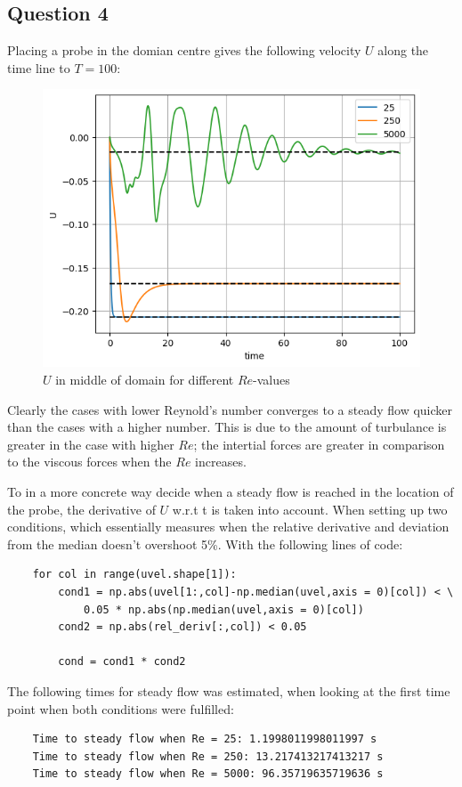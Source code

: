 \documentclass[10pt]{report}
\begin{document}
\subsection*{Question 4}
Placing a probe in the domian centre gives the following velocity $U$ along the time line to $T = 100$:
\begin{figure}[H]
    \centering
    \includegraphics[width = \textwidth]{plots/plot1.png}
    \caption{$U$ in middle of domain for different $Re$-values}
    \label{plot1}
\end{figure}
Clearly the cases with lower Reynold's number converges to a steady flow quicker than the cases with
a higher number. This is due to the amount of turbulance is greater in the case with higher $Re$; 
the intertial forces are greater in comparison to the viscous forces when the $Re$ increases.

To in a more concrete way decide when a steady flow is reached in the location of the probe, the derivative
of $U$ w.r.t t is taken into account. When setting up two conditions, which essentially measures when the relative derivative
and deviation from the median doesn't overshoot 5\%. With the following lines of code:
\begin{lstlisting}
    for col in range(uvel.shape[1]):
        cond1 = np.abs(uvel[1:,col]-np.median(uvel,axis = 0)[col]) < \
            0.05 * np.abs(np.median(uvel,axis = 0)[col])
        cond2 = np.abs(rel_deriv[:,col]) < 0.05

        cond = cond1 * cond2
\end{lstlisting}
The following times for steady flow was estimated, when looking at the 
first time point when both conditions were fulfilled:
\begin{lstlisting}
    Time to steady flow when Re = 25: 1.1998011998011997 s
    Time to steady flow when Re = 250: 13.217413217413217 s
    Time to steady flow when Re = 5000: 96.35719635719636 s
\end{lstlisting}
\end{document}
